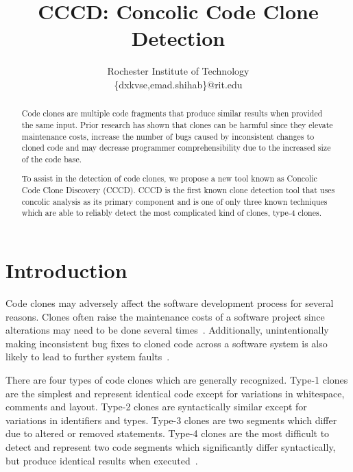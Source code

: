 \documentclass[conference]{IEEEtran}
\begin{document}
\title{CCCD: Concolic Code Clone Detection}

\author{
Rochester Institute of Technology\\
\{dxkvse,emad.shihab\}@rit.edu
}
\maketitle
\begin{abstract}


Code clones are multiple code fragments that produce similar results when provided the same input. Prior research has shown that clones can be harmful since they elevate maintenance costs, increase the number of bugs caused by inconsistent changes to cloned code and may decrease programmer comprehensibility due to the increased size of the code base.  

To assist in the detection of code clones, we propose a new tool known as Concolic Code Clone Discovery (CCCD). CCCD is the first known clone detection tool that uses concolic analysis as its primary component and is one of only three known techniques which are able to reliably detect the most complicated kind of clones, type-4 clones.


\end{abstract}


\IEEEpeerreviewmaketitle

\section{Introduction}



Code clones may adversely affect the software development process for several reasons. Clones often raise the maintenance costs of a software project since alterations may need to be done several times~\cite{Juergens:2009:CCM:1555001.1555062}. Additionally, unintentionally making inconsistent bug fixes to cloned code across a software system is also likely to lead to further system faults~\cite{Deissenboeck_2010}. 

There are four types of code clones which are generally recognized. Type-1 clones are the simplest and represent identical code except for variations in whitespace, comments and layout. Type-2 clones are syntactically similar except for variations in identifiers and types. Type-3 clones are two segments which differ due to altered or removed statements. Type-4 clones are the most difficult to detect and represent two code segments which significantly differ syntactically, but produce identical results when executed~\cite{Gold:2010:ICC:1808901.1808916}. 
\end{document}
